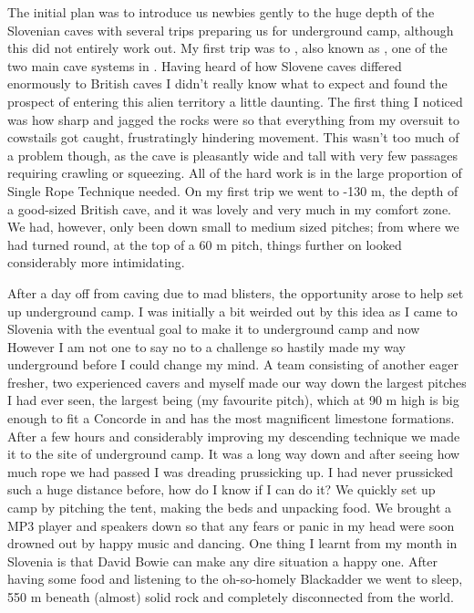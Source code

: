 The initial plan was to introduce us newbies gently to the huge depth of the Slovenian caves with
several trips preparing us for underground camp, although this did not entirely work out. My first
trip was to , also known as , one of the two main cave systems in .
Having heard of how Slovene caves differed enormously to British caves I didn't really know what
to expect and found the prospect of entering this alien territory a little daunting. The first thing I
noticed was how sharp and jagged the rocks were so that everything from my oversuit to cowstails got
caught, frustratingly hindering movement. This wasn't too much of a problem though, as the cave is
pleasantly wide and tall with very few passages requiring crawling or squeezing. All of the hard work
is in the large proportion of Single Rope Technique needed. On my first trip we went to -130 m, the
depth of a good-sized British cave, and it was lovely and very much in my comfort zone. We had, however, only been down small to medium sized pitches; from where we had turned round, at the top
of a 60 m pitch, things further on looked considerably more intimidating.


After a day off from caving due to mad blisters, the opportunity arose to help set up underground
camp. I was initially a bit weirded out by this idea as I came to Slovenia with the eventual goal to make
it to underground camp and now  However I am
not one to say no to a challenge so hastily made my way underground before I could change my mind.
A team consisting of another eager fresher, two experienced cavers and myself made our way down the
largest pitches I had ever seen, the largest being  (my favourite pitch), which at 90 m high is
big enough to fit a Concorde in and has the most magnificent limestone formations. After a few hours
and considerably improving my descending technique we made it to the site of underground camp. It
was a long way down and after seeing how much rope we had passed I was dreading prussicking up. I
had never prussicked such a huge distance before, how do I know if I can do it? We quickly set up camp
by pitching the tent, making the beds and unpacking food. We brought a MP3 player and speakers
down so that any fears or panic in my head were soon drowned out by happy music and dancing. One
thing I learnt from my month in Slovenia is that David Bowie can make any dire situation a happy
one. After having some food and listening to the oh-so-homely Blackadder we went to sleep, 550 m
beneath (almost) solid rock and completely disconnected from the world.



